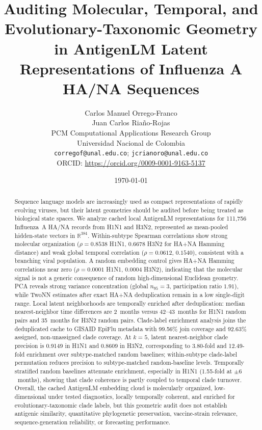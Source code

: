 \documentclass[11pt]{article}
\title{Auditing Molecular, Temporal, and Evolutionary-Taxonomic Geometry in AntigenLM Latent Representations of Influenza A HA/NA Sequences}
\author{
Carlos Manuel Orrego-Franco\\
Juan Carlos Riaño-Rojas\\
\vspace{0.4em}
\small PCM Computational Applications Research Group\\
\small Universidad Nacional de Colombia\\
\small \texttt{corregof@unal.edu.co}; \texttt{jcrianoro@unal.edu.co}\\
\small ORCID: \url{https://orcid.org/0009-0001-9163-5137}
}
\date{\today}
\newcommand{\R}{\mathbb{R}}
\begin{document}
\maketitle

\begin{abstract}
Sequence language models are increasingly used as compact representations
of rapidly evolving viruses, but their latent geometries should be audited
before being treated as biological state spaces. We analyze cached local
AntigenLM representations for 111,756 Influenza~A HA/NA records from H1N1
and H3N2, represented as mean-pooled hidden-state vectors in $\R^{384}$.
Within-subtype Spearman correlations show strong molecular organization
($\rho = 0.8538$ H1N1, $0.6678$ H3N2 for HA+NA Hamming distance) and
weak global temporal correlation ($\rho = 0.0612$, $0.1540$), consistent
with a branching viral population. A random embedding control gives HA+NA
Hamming correlations near zero ($\rho = 0.0001$ H1N1, $0.0004$ H3N2),
indicating that the molecular signal is not a generic consequence of random
high-dimensional Euclidean geometry. PCA reveals strong variance concentration
(global $n_{95} = 3$, participation ratio $1.91$), while TwoNN estimates
after exact HA+NA deduplication remain in a low single-digit range.
Local latent neighborhoods are temporally enriched after deduplication:
median nearest-neighbor time differences are 2~months versus 42--43~months
for H1N1 random pairs and 35~months for H3N2 random pairs.
Clade-label enrichment analysis joins the deduplicated cache to GISAID
EpiFlu metadata with 99.56\% join coverage and 92.63\% assigned,
non-unassigned clade coverage. At $k = 5$, latent nearest-neighbor clade
precision is 0.9149 in H1N1 and 0.8609 in H3N2, corresponding to
3.80-fold and 12.49-fold enrichment over subtype-matched random baselines;
within-subtype clade-label permutation reduces precision to subtype-matched random-baseline
levels. Temporally stratified random baselines attenuate enrichment,
especially in H1N1 (1.55-fold at $\pm 6$~months), showing that clade
coherence is partly coupled to temporal clade turnover. Overall, the
cached AntigenLM embedding cloud is molecularly organized, low-dimensional
under tested diagnostics, locally temporally coherent, and enriched for
evolutionary-taxonomic clade labels, but this geometric audit does not
establish antigenic similarity, quantitative phylogenetic preservation,
vaccine-strain relevance, sequence-generation reliability, or forecasting
performance.
\end{abstract}
\end{document}
